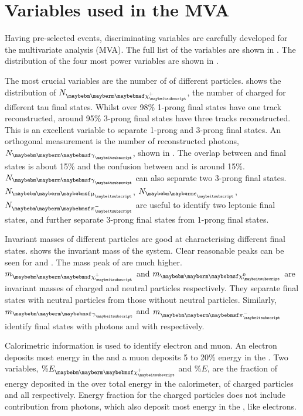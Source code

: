 \section{Variables used in the MVA}
\label{sec:tauVar}


Having pre-selected events, discriminating variables are carefully developed for the multivariate analysis (MVA). The full list of the variables are shown in . The distribution of the four most power variables are shown in .



The most crucial variables are the number of \PFOs of different particles.  shows the distribution of ${N}_{\charge}$, the number of  charged \PFOs for different tau final states. Whilst over 98\% 1-prong final states have one track reconstructed, around 95\%  3-prong final states have three tracks reconstructed. This is an excellent variable to separate 1-prong and 3-prong final states. An orthogonal measurement is the number of reconstructed photons,  ${N}_{\Pgg}$, shown in . The overlap between \decayPionShort and \decayRhoShort final states is about 15\% and the confusion between \decayRhoShort and \decayAiPhotonShort is around 15\%. ${N}_{\Pgg}$ can also separate two 3-prong final states. ${N}_{\Pmu}$, ${N}_{\Pe}$, ${N}_{\Pgpm}$ are useful to identify two leptonic final states, and further separate 3-prong final states from 1-prong final states.

Invariant masses of different particles are good at characterising different final states.  shows the invariant mass of the system. Clear reasonable peaks can be seen for \Prho and \Pai. The mass peak of  \decayAiPionFinalStateShort are much higher. $m_{\charge}$ and $m_{\neutral}$ are invariant masses of charged and neutral particles respectively. They separate final states with neutral particles from those without neutral particles. Similarly, $m_{\Pgg}$ and $m_{\Pgpm}$ identify final states with photons and with \Pgpm respectively.

Calorimetric information is used to identify electron and muon. An electron deposits most energy in the \ECAL and a muon deposits 5 to 20\% energy in the \ECAL. Two variables, $\% E_{\charge}$ and $\% E$, are the fraction of energy deposited in the \ECAL over total energy in the calorimeter, of charged particles and all \PFOs respectively. Energy fraction for the charged particles does not include contribution from photons, which also deposit most energy in the \ECAL, like electrons.

